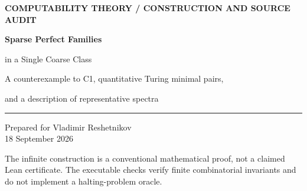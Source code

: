 \documentclass[11pt,a4paper]{article}
\theoremstyle{definition}\newtheorem{definition}[theorem]{Definition}
\theoremstyle{remark}\newtheorem{remark}[theorem]{Remark}
\begin{document}
\begin{titlepage}
\vspace*{12mm}
{\small\sffamily\bfseries\color{navy}COMPUTABILITY THEORY \quad / \quad CONSTRUCTION AND SOURCE AUDIT\par}
\vspace{15mm}
{\Huge\bfseries\color{navy}Sparse Perfect Families\par}
\vspace{4mm}
{\LARGE in a Single Coarse Class\par}
\vspace{10mm}
{\large A counterexample to C1, quantitative Turing minimal pairs,\par
and a description of representative spectra\par}
\vspace{13mm}
\noindent\rule{\textwidth}{0.5pt}
\vspace{5mm}
\noindent Prepared for Vladimir Reshetnikov\\[3pt]
18 September 2026
\vspace{9mm}
\begin{abstract}
We attack C1 in the supplied report: must a nonuniform coarse-equivalence class
contain a representative of least Turing degree? The answer is negative. An
important source audit shows that this conclusion already follows from a 2016
theorem of Hirschfeldt, Jockusch, Kuyper, and Schupp, although the coarse clause
is posed again in the displayed Question~7 of Gerdes's 2025 preprint.
We therefore do not claim a new resolution of that question.

The main work here is an independent finite-extension construction with a much
more specific conclusion. For every computable, nondecreasing, unbounded
sublinear function $h$, we construct a perfect family of individually
$1$-generic sets, any two distinct members of which form a Turing minimal pair.
All members agree outside one set $V$ satisfying
$|V\cap[0,n)|\le h(n)$ for every $n$. Two witnesses and the tree labeling are
computable in $0''$. The proof combines a one-bit connectivity lemma with a
global variation budget and perfect-tree fusion. We also identify the Turing
spectra of density-equivalence, uniform coarse-equivalence, and nonuniform
coarse-equivalence classes, and characterize when such spectra have a least
degree. All mathematical proofs are included; finite verification code is
provided separately. Priority for the quantitative refinement is not established.
\end{abstract}
\vfill
\noindent\small The infinite construction is a conventional mathematical proof, not a
claimed Lean certificate. The executable checks verify finite combinatorial
invariants and do not implement a halting-problem oracle.
\end{titlepage}
\end{document}
